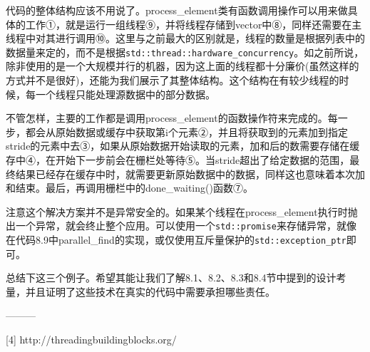 代码的整体结构应该不用说了。process\_element类有函数调用操作可以用来做具体的工作①，就是运行一组线程⑨，并将线程存储到vector中⑧，同样还需要在主线程中对其进行调用⑩。这里与之前最大的区别就是，线程的数量是根据列表中的数据量来定的，而不是根据\texttt{std::thread::hardware\_concurrency}。如之前所说，除非使用的是一个大规模并行的机器，因为这上面的线程都十分廉价(虽然这样的方式并不是很好)，还能为我们展示了其整体结构。这个结构在有较少线程的时候，每一个线程只能处理源数据中的部分数据。

不管怎样，主要的工作都是调用process\_element的函数操作符来完成的。每一步，都会从原始数据或缓存中获取第i个元素②，并且将获取到的元素加到指定stride的元素中去③，如果从原始数据开始读取的元素，加和后的数需要存储在缓存中④，在开始下一步前会在栅栏处等待⑤。当stride超出了给定数据的范围，最终结果已经存在缓存中时，就需要更新原始数据中的数据，同样这也意味着本次加和结束。最后，再调用栅栏中的done\_waiting()函数⑦。

注意这个解决方案并不是异常安全的。如果某个线程在process\_element执行时抛出一个异常，就会终止整个应用。可以使用一个\texttt{std::promise}来存储异常，就像在代码8.9中parallel\_find的实现，或仅使用互斥量保护的\texttt{std::exception\_ptr}即可。

总结下这三个例子。希望其能让我们了解8.1、8.2、8.3和8.4节中提到的设计考量，并且证明了这些技术在真实的代码中需要承担哪些责任。

---------

[4] http://threadingbuildingblocks.org/